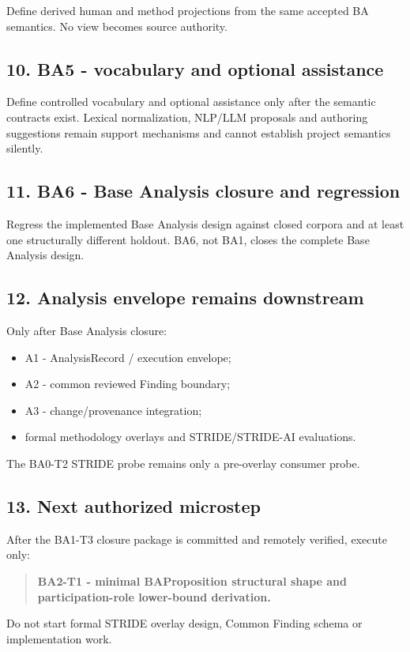 \documentclass[
  10pt,
  a4paper,
]{article}
\providecommand{\tightlist}{%
  \setlength{\itemsep}{0pt}\setlength{\parskip}{0pt}}
\begin{document}
Define derived human and method projections from the same accepted BA
semantics. No view becomes source authority.

\subsection{10. BA5 - vocabulary and optional
assistance}\label{ba5---vocabulary-and-optional-assistance}

Define controlled vocabulary and optional assistance only after the
semantic contracts exist. Lexical normalization, NLP/LLM proposals and
authoring suggestions remain support mechanisms and cannot establish
project semantics silently.

\subsection{11. BA6 - Base Analysis closure and
regression}\label{ba6---base-analysis-closure-and-regression}

Regress the implemented Base Analysis design against closed corpora and
at least one structurally different holdout. BA6, not BA1, closes the
complete Base Analysis design.

\subsection{12. Analysis envelope remains
downstream}\label{analysis-envelope-remains-downstream}

Only after Base Analysis closure:

\begin{itemize}
\tightlist
\item
  A1 - AnalysisRecord / execution envelope;
\item
  A2 - common reviewed Finding boundary;
\item
  A3 - change/provenance integration;
\item
  formal methodology overlays and STRIDE/STRIDE-AI evaluations.
\end{itemize}

The BA0-T2 STRIDE probe remains only a pre-overlay consumer probe.

\subsection{13. Next authorized
microstep}\label{next-authorized-microstep}

After the BA1-T3 closure package is committed and remotely verified,
execute only:

\begin{quote}
\textbf{BA2-T1 - minimal BAProposition structural shape and
participation-role lower-bound derivation.}
\end{quote}

Do not start formal STRIDE overlay design, Common Finding schema or
implementation work.
\end{document}
